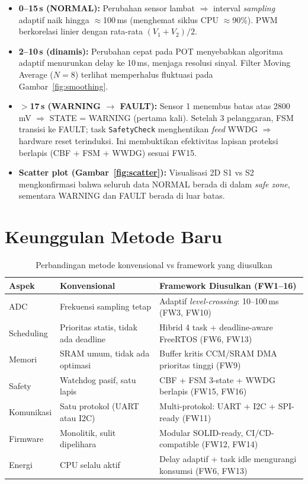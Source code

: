 \documentclass[12pt,a4paper]{article}
\begin{document}
\begin{itemize}
    \item \textbf{0--15\,s (NORMAL):} Perubahan sensor lambat $\Rightarrow$ interval \textit{sampling} adaptif naik hingga $\approx$100\,ms (menghemat siklus CPU $\approx$90\%). PWM berkorelasi linier dengan rata-rata $(V_1+V_2)/2$.

    \item \textbf{2--10\,s (dinamis):} Perubahan cepat pada POT menyebabkan algoritma adaptif menurunkan delay ke 10\,ms, menjaga resolusi sinyal. Filter Moving Average ($N=8$) terlihat memperhalus fluktuasi pada Gambar~\ref{fig:smoothing}.

    \item \textbf{$>$17\,s (WARNING $\rightarrow$ FAULT):} Sensor 1 menembus batas atas 2800\,mV $\Rightarrow$ STATE = WARNING (pertama kali). Setelah 3 pelanggaran, FSM transisi ke FAULT; task \texttt{SafetyCheck} menghentikan \textit{feed} WWDG $\Rightarrow$ hardware reset terinduksi. Ini membuktikan efektivitas lapisan proteksi berlapis (CBF + FSM + WWDG) sesuai FW15.

    \item \textbf{Scatter plot (Gambar~\ref{fig:scatter}):} Visualisasi 2D S1 vs S2 mengkonfirmasi bahwa seluruh data NORMAL berada di dalam \textit{safe zone}, sementara WARNING dan FAULT berada di luar batas.
\end{itemize}

\section{Keunggulan Metode Baru}

\begin{table}[H]
\centering
\caption{Perbandingan metode konvensional vs framework yang diusulkan}\label{tab:keunggulan}
\small
\begin{tabular}{@{}lp{5.5cm}p{5.5cm}@{}}
\toprule
\textbf{Aspek} & \textbf{Konvensional} & \textbf{Framework Diusulkan (FW1--16)} \\
\midrule
ADC & Frekuensi sampling tetap & Adaptif \textit{level-crossing}: 10--100\,ms (FW3, FW10) \\
Scheduling & Prioritas statis, tidak ada deadline & Hibrid 4 task + deadline-aware FreeRTOS (FW6, FW13) \\
Memori & SRAM umum, tidak ada optimasi & Buffer kritis CCM/SRAM DMA prioritas tinggi (FW9) \\
Safety & Watchdog pasif, satu lapis & CBF + FSM 3-state + WWDG berlapis (FW15, FW16) \\
Komunikasi & Satu protokol (UART atau I2C) & Multi-protokol: UART + I2C + SPI-ready (FW11) \\
Firmware & Monolitik, sulit dipelihara & Modular SOLID-ready, CI/CD-compatible (FW12, FW14) \\
Energi & CPU selalu aktif & Delay adaptif + task idle mengurangi konsumsi (FW6, FW13) \\
\bottomrule
\end{tabular}
\end{table}
\end{document}
